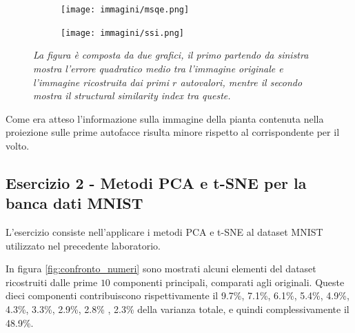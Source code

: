 \documentclass{article}
\begin{document}
\begin{figure}[H]
    \centering
    \begin{subfigure}[b]{0.49\textwidth}
        \centering
        \texttt{[image: immagini/msqe.png]}
    \end{subfigure}
    \begin{subfigure}[b]{0.49\textwidth}
        \centering
        \texttt{[image: immagini/ssi.png]}
    \end{subfigure}
    \caption{\emph{La figura è composta da due grafici, il primo partendo da sinistra mostra l'errore quadratico medio tra l'immagine originale e l'immagine ricostruita dai primi $r$ autovalori, mentre il secondo mostra il structural similarity index tra queste.}}
    \label{fig:information_loss}
\end{figure}

Come era atteso l'informazione sulla immagine della pianta contenuta nella proiezione sulle prime autofacce risulta minore rispetto al corrispondente per il volto. 

\subsection*{Esercizio 2 - Metodi PCA e t-SNE per la banca dati MNIST}
L'esercizio consiste nell'applicare i metodi PCA e t-SNE al dataset MNIST utilizzato nel precedente laboratorio.

In figura \ref{fig:confronto_numeri} sono mostrati alcuni elementi del dataset ricostruiti dalle prime $10$ componenti principali, comparati agli originali.
Queste dieci componenti contribuiscono rispettivamente il 9.7\%, 7.1\%, 6.1\%, 5.4\%, 4.9\%, 4.3\%, 3.3\%, 2.9\%, 2.8\% , 2.3\% della varianza totale, e quindi complessivamente il 48.9\%.
\end{document}

